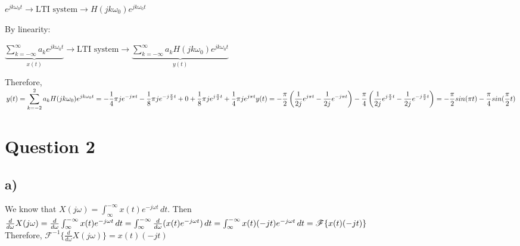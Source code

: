 \documentclass[12pt]{article}
\begin{document}
\begin{center}
\(e^{jk\omega_0 t} \longrightarrow \boxed{\textrm{LTI system}} \longrightarrow H(jk\omega_0) e^{jk\omega_0 t}\)
\end{center}
By linearity: 
\begin{center}
 \( \underbrace{\displaystyle\sum_{k=-\infty}^{\infty} a_k e^{jk\omega_0 t}}_{x(t)} \longrightarrow \boxed{\textrm{LTI system}} \longrightarrow \underbrace{\displaystyle\sum_{k=-\infty}^{\infty} a_k H(jk\omega_0) e^{jk\omega_0 t}}_{y(t)} \)
 \end{center}  
 Therefore, \begin{math} y(t) =  \displaystyle\sum_{k=-2}^{2} a_k H(jk\omega_0) e^{jk\omega_0 t} = - \frac{1}{4} \pi j e^{-j\pi t} - \frac{1}{8} \pi j e^{-j\frac{\pi}{2} t} + 0 + \frac{1}{8} \pi j e^{j\frac{\pi}{2} t} + \frac{1}{4} \pi j e^{j\pi t} \\
 y(t) = -\frac{\pi}{2} \left(\frac{1}{2j} e^{j\pi t} - \frac{1}{2j} e^{-j\pi t}\right)  -\frac{\pi}{4} \left(\frac{1}{2j} e^{j\frac{\pi}{2} t} - \frac{1}{2j} e^{-j\frac{\pi}{2} t}\right) = -\frac{\pi}{2} sin(\pi t) - \frac{\pi}{4} sin(\frac{\pi}{2} t)
 \end{math} 
    \section*{Question 2}
    \subsection*{a)}
    We know that \(X(j\omega) = \int_{\infty}^{-\infty} x(t)e^{-j\omega t} \,dt \). Then\\
    \begin{math}
      \frac{d}{d\omega} X(j\omega) = \frac{d}{d\omega} \int_{\infty}^{-\infty} x(t)e^{-j\omega t} \,dt\\
      =\int_{\infty}^{-\infty} \frac{d}{d\omega}(x(t)e^{-j\omega t}) \,dt\\
      = \int_{\infty}^{-\infty} x(t)(-jt)e^{-j\omega t} \,dt\\
      =\mathscr{F}\{x(t)(-jt)\}
    \end{math}\\
    Therefore, \(\mathscr{F}^{-1}\{\frac{d}{d\omega} X(j\omega)\}=x(t)(-jt)\)
\end{document}
